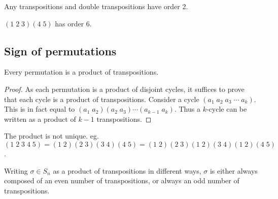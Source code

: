 \documentclass[a4paper]{article}
\begin{document}
\begin{eg}
  Any transpositions and double transpositions have order 2.

  $(1\; 2\; 3)(4\; 5)$ has order 6.
\end{eg}

\subsection{Sign of permutations}
\begin{prop}
  Every permutation is a product of transpositions.
\end{prop}

\begin{proof}
  As each permutation is a product of disjoint cycles, it suffices to prove that each cycle is a product of transpositions. Consider a cycle $(a_1\; a_2\; a_3\; \cdots\; a_k)$. This is in fact equal to $(a_1\; a_2)(a_2\; a_3)\cdots (a_{k-1}\; a_k)$. Thus a $k$-cycle can be written as a product of $k - 1$ transpositions.
\end{proof}

\note The product is not unique. eg. $(1\; 2\; 3\; 4\; 5) =(1\; 2)(2\; 3)(3\; 4)(4\; 5) = (1\; 2)(2\; 3)(1\; 2)(3\; 4)(1\; 2)(4\; 5)$.

\begin{thm}
  Writing $\sigma\in S_n$ as a product of transpositions in different ways, $\sigma$ is either always composed of an even number of transpositions, or always an odd number of transpositions.
\end{thm}
\end{document}
